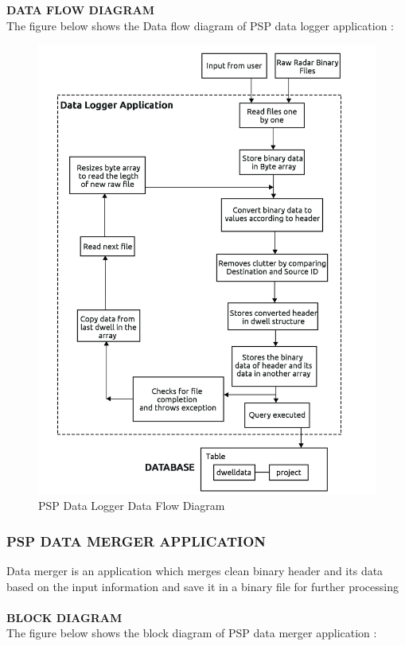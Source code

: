 \documentclass[14pt]{article} %
\begin{document}
\pagebreak
\noindent \textbf{DATA FLOW DIAGRAM}
\\ The figure below shows the Data flow diagram of PSP data logger application :

\begin{figure}[H]
    \centerline{\includegraphics[width=\linewidth]{flow-diagram.jpg}}
  \caption{PSP Data Logger Data Flow Diagram}
  \label{fig:figure 12}
\end{figure}


\subsubsection{PSP DATA MERGER APPLICATION}
Data merger is an application which merges clean binary header and its data based on the input information and save it in a binary file for further processing\\
\\ \textbf{BLOCK DIAGRAM}
\\ The figure below shows the block diagram of PSP data merger application :
\end{document}
